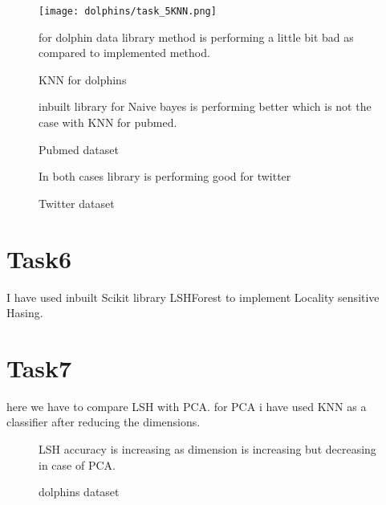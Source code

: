 \documentclass{article}
\begin{document}
\begin{figure}[!htb]

\texttt{[image: dolphins/task\_5KNN.png]}
\caption{KNN for dolphins}
for dolphin data library method is performing a little bit bad as compared to implemented method.
\end{figure}

\begin{figure}[!htb]%
\centering
    \qquad
    \caption{Pubmed dataset}%
    \label{fig:example}%
   
inbuilt library for Naive bayes is performing better which is not the case with KNN for pubmed.
\end{figure}

\begin{figure}[!htb]%
\centering
    \qquad
    \caption{Twitter dataset}%
    \label{fig:example}%
    
    In both cases library is performing good for twitter
    
\end{figure}

\section{Task6}
I have used inbuilt Scikit library LSHForest to implement Locality sensitive Hasing.

\section{Task7}
here we have to compare LSH with PCA. for PCA i have used KNN as a classifier after reducing the dimensions.
\begin{figure}[!htb]%
\centering
    \qquad
    \caption{dolphins dataset}%
    \label{fig:example}%
   
LSH accuracy is increasing as dimension is increasing but decreasing in case of PCA.
\end{figure}
\end{document}
